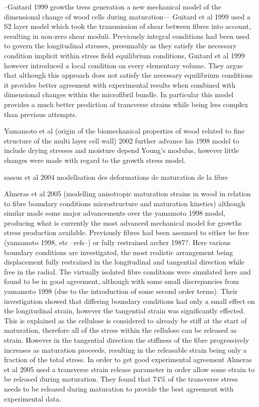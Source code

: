 \documentclass{article}
\begin{document}
--Guitard 1999 growths tress generation a new mechanical model of the
dimensional change of wood cells during maturation---
Guitard et al 1999 used a S2 layer model which took the transmission of shear
between fibres into account, resulting in non-zero shear moduli. Previously
integral conditions had been used to govern the longitudinal stresses,
presumably as they satisfy the necessary condition implicit within stress field
equilibrium conditions, Guitard et al 1999 however introduced a local condition on
every elementary volume. They argue that although this approach does not satisfy
the necessary equilibrium conditions it provides better agreement with
experimental results when combined with dimensional changes within the
microfibril bundle. In particular this model provides a much better prediction
of transverse strains while being less complex than previous attempts.

Yamamoto et al (origin of the biomechanical properties of wood related to fine
structure of the multi layer cell wall) 2002 further advance his 1998 model to
include drying stresses and moisture depend Young's modulus, however little
changes were made with regard to the growth stress model.

sassus et al 2004 modellsation des deformations de maturation de la fibre

Almeras et al 2005 (modelling anisotropic maturation strains in wood in
relation to fibre boundary conditions microstructure and maturation kinetics)
although similar made some major advancements over the yamamoto 1998 model,
producing what is currently the most advanced mechanical model for growths
stress production available. Previously fibres had been assumed to either be
free (yamamoto 1998, etc --refs--) or fully restrained archer 1987?. Here
various boundary conditions are investigated, the most realistic arrangement being
displacement fully restrained in the longitudinal and tangential direction while
free in the radial. The virtually isolated fibre conditions were simulated here
and found to be in good agreement, although with some small discrepancies from
yamamoto 1998 (due to the introduction of some second order terms).  Their
investigation showed that differing boundary conditions had only a small effect
on the longitudinal strain, however the tangential strain was significantly
effected. This is explained as the cellulose is considered to already be stiff at
the start of maturation, therefore all of the stress within the cellulose can be
released as strain. However in the tangential direction the stiffness of the
fibre progressively increases as maturation proceeds, resulting in the
releasable strain being only a fraction of the total stress. In order to get good
experimental agreement Almeras et al 2005 used a transverse strain release
parameter in order allow some strain to be released during maturation. They
found that 74\% of the transverse stress needs to be released during maturation
to provide the best agreement with experimental data.
\end{document}
